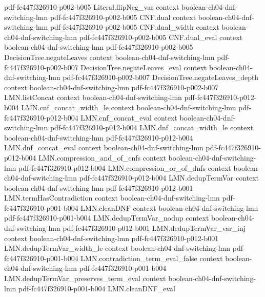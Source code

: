 \begin{lemma}
  {pdf-fc447f326910-p002-b005}
\proofstep
  {Literal.flipNeg_var}
  {context}
  {boolean-ch04-dnf-switching-lmn}
  {pdf-fc447f326910-p002-b005}
\proofstep
  {CNF.dual}
  {context}
  {boolean-ch04-dnf-switching-lmn}
  {pdf-fc447f326910-p002-b005}
\proofstep
  {CNF.dual_width}
  {context}
  {boolean-ch04-dnf-switching-lmn}
  {pdf-fc447f326910-p002-b005}
\proofstep
  {CNF.dual_eval}
  {context}
  {boolean-ch04-dnf-switching-lmn}
  {pdf-fc447f326910-p002-b005}
\proofstep
  {DecisionTree.negateLeaves}
  {context}
  {boolean-ch04-dnf-switching-lmn}
  {pdf-fc447f326910-p002-b007}
\proofstep
  {DecisionTree.negateLeaves_eval}
  {context}
  {boolean-ch04-dnf-switching-lmn}
  {pdf-fc447f326910-p002-b007}
\proofstep
  {DecisionTree.negateLeaves_depth}
  {context}
  {boolean-ch04-dnf-switching-lmn}
  {pdf-fc447f326910-p002-b007}
\proofstep
  {LMN.listConcat}
  {context}
  {boolean-ch04-dnf-switching-lmn}
  {pdf-fc447f326910-p012-b004}
\proofstep
  {LMN.cnf_concat_width_le}
  {context}
  {boolean-ch04-dnf-switching-lmn}
  {pdf-fc447f326910-p012-b004}
\proofstep
  {LMN.cnf_concat_eval}
  {context}
  {boolean-ch04-dnf-switching-lmn}
  {pdf-fc447f326910-p012-b004}
\proofstep
  {LMN.dnf_concat_width_le}
  {context}
  {boolean-ch04-dnf-switching-lmn}
  {pdf-fc447f326910-p012-b004}
\proofstep
  {LMN.dnf_concat_eval}
  {context}
  {boolean-ch04-dnf-switching-lmn}
  {pdf-fc447f326910-p012-b004}
\proofstep
  {LMN.compression_and_of_cnfs}
  {context}
  {boolean-ch04-dnf-switching-lmn}
  {pdf-fc447f326910-p012-b004}
\proofstep
  {LMN.compression_or_of_dnfs}
  {context}
  {boolean-ch04-dnf-switching-lmn}
  {pdf-fc447f326910-p012-b004}
\proofstep
  {LMN.dedupTermVar}
  {context}
  {boolean-ch04-dnf-switching-lmn}
  {pdf-fc447f326910-p012-b001}
\proofstep
  {LMN.termHasContradiction}
  {context}
  {boolean-ch04-dnf-switching-lmn}
  {pdf-fc447f326910-p001-b004}
\proofstep
  {LMN.cleanDNF}
  {context}
  {boolean-ch04-dnf-switching-lmn}
  {pdf-fc447f326910-p001-b004}
\proofstep
  {LMN.dedupTermVar_nodup}
  {context}
  {boolean-ch04-dnf-switching-lmn}
  {pdf-fc447f326910-p012-b001}
\proofstep
  {LMN.dedupTermVar_var_inj}
  {context}
  {boolean-ch04-dnf-switching-lmn}
  {pdf-fc447f326910-p012-b001}
\proofstep
  {LMN.dedupTermVar_width_le}
  {context}
  {boolean-ch04-dnf-switching-lmn}
  {pdf-fc447f326910-p001-b004}
\proofstep
  {LMN.contradiction_term_eval_false}
  {context}
  {boolean-ch04-dnf-switching-lmn}
  {pdf-fc447f326910-p001-b004}
\proofstep
  {LMN.dedupTermVar_preserves_term_eval}
  {context}
  {boolean-ch04-dnf-switching-lmn}
  {pdf-fc447f326910-p001-b004}
\proofstep
  {LMN.cleanDNF_eval}

\end{lemma}
